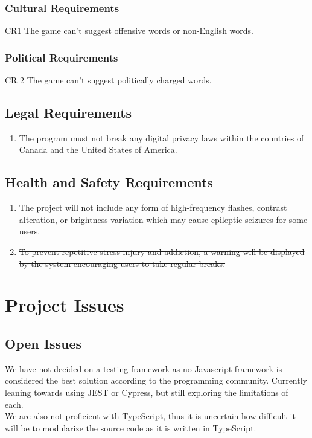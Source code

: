 \documentclass[12pt, titlepage]{article}
\begin{document}
	\subsubsection{Cultural Requirements}
	CR1 The game can't suggest offensive words or non-English words.
	
	\subsubsection{Political Requirements}
	CR 2 The game can't suggest politically charged words.
	
	\subsection{Legal Requirements}
	\begin{enumerate}[label=LR\arabic*]
		\item The program must not break any digital privacy laws within the 
		countries of 
		Canada 
		and the United States of America.
	\end{enumerate}
	\subsection{Health and Safety Requirements}
	\begin{enumerate}[label=HS\arabic*]
		\item The project will not include any form of high-frequency flashes, 
		contrast 
		alteration, or brightness variation which may cause epileptic seizures 
		for 
		some 
		users.
		\item \st{To prevent repetitive stress injury and addiction, a warning will 
		be 
		displayed by the system encouraging users to take regular breaks.}
	\end{enumerate}
	\section{Project Issues}
	
	\subsection{Open Issues} We have not decided on a testing framework as no
	Javascript framework is considered the best solution according to the
	programming community. Currently leaning towards using JEST or Cypress, but
	still exploring the limitations of each. \\
	We are also not proficient with TypeScript, thus it is uncertain how 
	difficult it will be to modularize the source code as it is written in 
	TypeScript. 
	
\end{document}

